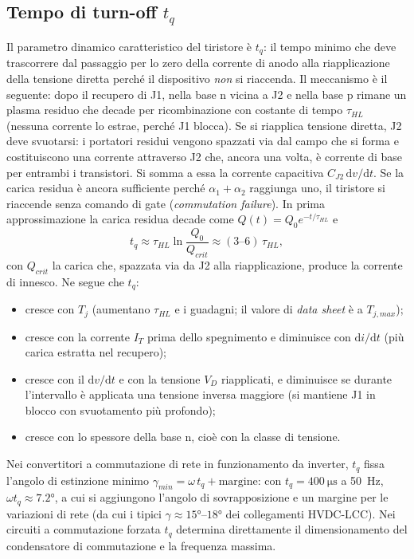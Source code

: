 \documentclass[11pt,a4paper]{article}
\newcommand{\tq}{\ensuremath{t_q}}
\newcommand{\dvdt}{\ensuremath{\mathrm{d}v/\mathrm{d}t}}
\newcommand{\didt}{\ensuremath{\mathrm{d}i/\mathrm{d}t}}
\newcommand{\en}[1]{\emph{#1}}   %
\begin{document}
\subsection{Tempo di turn-off \texorpdfstring{$\tq$}{tq}}
Il parametro dinamico caratteristico del tiristore è $\tq$: il tempo minimo che deve trascorrere dal passaggio per lo zero della corrente di anodo alla riapplicazione della tensione diretta perché il dispositivo \emph{non} si riaccenda. Il meccanismo è il seguente: dopo il recupero di J1, nella base n vicina a J2 e nella base p rimane un plasma residuo che decade per ricombinazione con costante di tempo $\tau_{HL}$ (nessuna corrente lo estrae, perché J1 blocca). Se si riapplica tensione diretta, J2 deve svuotarsi: i portatori residui vengono spazzati via dal campo che si forma e costituiscono una corrente attraverso J2 che, ancora una volta, è corrente di base per entrambi i transistori. Si somma a essa la corrente capacitiva $C_{J2}\,\dvdt$. Se la carica residua è ancora sufficiente perché $\alpha_1+\alpha_2$ raggiunga uno, il tiristore si riaccende senza comando di gate (\en{commutation failure}). In prima approssimazione la carica residua decade come $Q(t)=Q_0 e^{-t/\tau_{HL}}$ e
\begin{equation}
  \tq \approx \tau_{HL}\ln\frac{Q_0}{Q_{crit}} \approx (\numrange{3}{6})\,\tau_{HL},
\end{equation}
con $Q_{crit}$ la carica che, spazzata via da J2 alla riapplicazione, produce la corrente di innesco. Ne segue che $\tq$:
\begin{itemize}
  \item cresce con $T_j$ (aumentano $\tau_{HL}$ e i guadagni; il valore di \en{data sheet} è a $T_{j,max}$);
  \item cresce con la corrente $I_T$ prima dello spegnimento e diminuisce con $\didt$ (più carica estratta nel recupero);
  \item cresce con il $\dvdt$ e con la tensione $V_D$ riapplicati, e diminuisce se durante l'intervallo è applicata una tensione inversa maggiore (si mantiene J1 in blocco con svuotamento più profondo);
  \item cresce con lo spessore della base n, cioè con la classe di tensione.
\end{itemize}
Nei convertitori a commutazione di rete in funzionamento da inverter, $\tq$ fissa l'angolo di estinzione minimo $\gamma_{min} = \omega\,\tq + \text{margine}$: con $\tq=\qty{400}{\us}$ a \qty{50}{\Hz}, $\omega\tq \approx \ang{7.2}$, a cui si aggiungono l'angolo di sovrapposizione e un margine per le variazioni di rete (da cui i tipici $\gamma\approx\ang{15}$--$\ang{18}$ dei collegamenti HVDC-LCC). Nei circuiti a commutazione forzata $\tq$ determina direttamente il dimensionamento del condensatore di commutazione e la frequenza massima.
\end{document}
